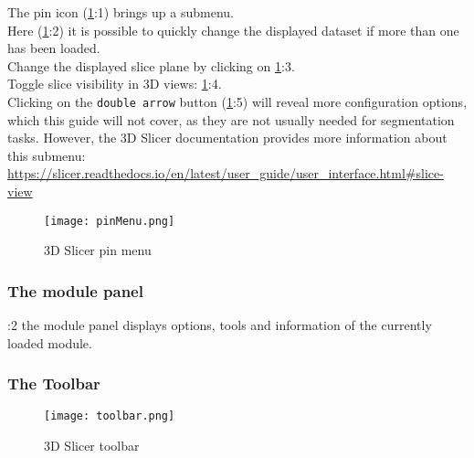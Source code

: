 \noindent
The pin icon (\cref{fig:pinMenu}:1) brings up a submenu.\\
\noindent
Here (\cref{fig:pinMenu}:2) it is possible to quickly change the displayed dataset if more than one has been loaded.\\
Change the displayed slice plane by clicking on \cref{fig:pinMenu}:3.\\
Toggle slice visibility in 3D views: \cref{fig:pinMenu}:4.\\
Clicking on the \texttt{double arrow} button (\cref{fig:pinMenu}:5) will reveal more configuration options, which this guide will not cover, as they are not usually needed for segmentation tasks.
However, the 3D Slicer documentation provides more information about this submenu: \url{https://slicer.readthedocs.io/en/latest/user_guide/user_interface.html#slice-view}
\begin{figure}[h!] %
	\centerline{ %
		\texttt{[image: pinMenu.png]}}
	\caption{3D Slicer pin menu}\label{fig:pinMenu}
\end{figure}
\pagebreak

\subsubsection{The module panel}
:2 the module panel displays options, tools and information of the currently loaded module.

\subsubsection{The Toolbar}
\begin{figure}[h!] %
	\centerline{ %
		\texttt{[image: toolbar.png]}}
	\caption{3D Slicer toolbar}\label{fig:toolbar}
\end{figure}

